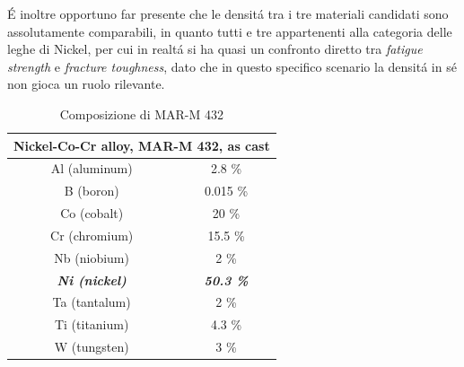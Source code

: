 \documentclass{article}
\begin{document}
        É inoltre opportuno far presente che le densitá tra i tre materiali candidati sono assolutamente comparabili, 
        in quanto tutti e tre appartenenti alla categoria delle leghe di Nickel, per cui in realtá si ha 
        quasi un confronto diretto tra \textit{fatigue strength} e \textit{fracture toughness}, dato che in questo specifico 
        scenario la densitá in sé non gioca un ruolo rilevante.

        

    
        \begin{table}[h!]
            \centering
            \begin{tabular}{@{}cc@{}}
            \toprule
            \multicolumn{2}{c}{\textbf{Nickel-Co-Cr alloy, MAR-M 432, as cast}} \\ \midrule
            Al (aluminum)                       & 2.8 \%                         \\
            B (boron)                           & 0.015 \%                       \\
            Co (cobalt)                         & 20 \%                          \\
            Cr (chromium)                       & 15.5 \%                        \\
            Nb (niobium)                        & 2 \%                           \\
            \textit{\textbf{Ni (nickel)}}       & \textit{\textbf{50.3 \%}}      \\
            Ta (tantalum)                       & 2 \%                           \\
            Ti (titanium)                       & 4.3 \%                         \\
            W (tungsten)                        & 3 \%                           \\ \bottomrule
            \end{tabular}
            \caption{Composizione di MAR-M 432}
            \label{tab:marm_composition}
            \end{table}
\end{document}
